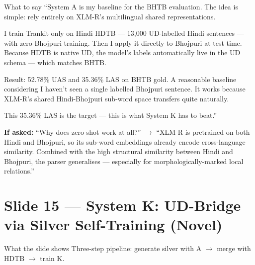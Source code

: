 \documentclass[11pt]{article}
\begin{document}
\begin{pitchbox}{What to say}
``System A is my baseline for the BHTB evaluation. The idea is simple: rely entirely on XLM-R's multilingual shared representations.

I train Trankit only on Hindi HDTB --- 13,000 UD-labelled Hindi sentences --- with zero Bhojpuri training. Then I apply it directly to Bhojpuri at test time. Because HDTB is native UD, the model's labels automatically live in the UD schema --- which matches BHTB.

Result: 52.78\% UAS and 35.36\% LAS on BHTB gold. A reasonable baseline considering I haven't seen a single labelled Bhojpuri sentence. It works because XLM-R's shared Hindi-Bhojpuri sub-word space transfers quite naturally.

This 35.36\% LAS is the target --- this is what System K has to beat.''
\end{pitchbox}

\begin{tipbox}
\textbf{If asked:} ``Why does zero-shot work at all?'' $\to$ ``XLM-R is pretrained on both Hindi and Bhojpuri, so its sub-word embeddings already encode cross-language similarity. Combined with the high structural similarity between Hindi and Bhojpuri, the parser generalises --- especially for morphologically-marked local relations.''
\end{tipbox}

\section{Slide 15 --- System K: UD-Bridge via Silver Self-Training (Novel)}

\begin{pitchbox}{What the slide shows}
Three-step pipeline: generate silver with A $\to$ merge with HDTB $\to$ train K.
\end{pitchbox}
\end{document}
